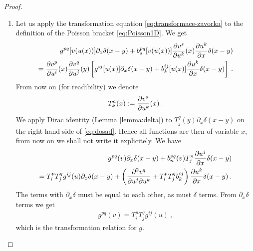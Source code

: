 \begin{proof}
    \begin{enumerate}
        \item Let us apply the transformation equation \eqref{eq:transformace-zavorka} to the definition of the Poisson bracket \eqref{eq:Poisson1D}. We get 
        \begin{align}
            g^{pq}[v(u(x))] \partial_x \delta(x-y) + b^{pq}_s[v(u(x))] \frac{\partial v^s}{\partial u^k}(x) \frac{\partial u^k}{\partial x} \delta(x-y) \nonumber
            \\ = \frac{\partial v^p}{\partial u^i}(x) \frac{\partial v^q}{\partial u^j}(y) \left[ g^{ij}[u(x)] \partial_x \delta(x-y) + b^{ij}_k[u(x)] \frac{\partial u^k}{\partial x} \delta(x-y) \right] \:. \label{eq:dosad}
        \end{align}
        From now on (for readibility) we denote 
        \begin{align}
            T^a_k(x) := \frac{\partial v^a}{\partial u^k}(x) \:.
        \end{align}
        We apply Dirac identity (Lemma \vref{lemma:delta}) to $T^q_j(y) \partial_x \delta(x-y)$ on the right-hand side of \eqref{eq:dosad}. Hence all functions are then of variable $x$, from now on we shall not write it explicitely. We have
        \begin{align}
            g^{pq}(v) \partial_x \delta(x-y) + b^{pq}_n(v) T^n_j \frac{\partial u^j}{\partial x} \delta(x-y) \nonumber
            \\ = T^p_i T^q_j g^{ij}(u) \partial_x \delta(x-y) 
            + \left( \frac{\partial^2 v^q}{\partial u^j \partial u^k} + T^p_i T^q_j b^{ij}_k \right) \frac{\partial u^k}{\partial x} \delta(x-y) \:. \label{eq:porovnani}
        \end{align}
        The terms with $\partial_x \delta$ must be equal to each other, as must $\delta$ terms. From $\partial_x \delta$ terms we get
        \begin{align}
            g^{pq}(v) = T^p_i T^q_j g^{ij}(u) \:,
        \end{align}
        which is the transformation relation for $g$.


\end{enumerate}
\end{proof}
